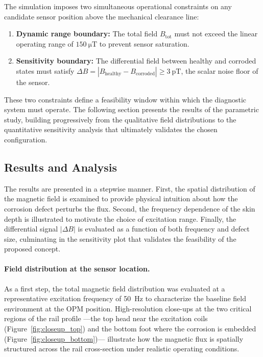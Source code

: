 The simulation imposes two simultaneous operational constraints on any
candidate sensor position above the mechanical clearance line:

\begin{enumerate}
    \item \textbf{Dynamic range boundary:} The total field $B_{\mathrm{tot}}$
    must not exceed the linear operating range of
    $\SI{150}{\micro\tesla}$ to prevent sensor saturation.

    \item \textbf{Sensitivity boundary:} The differential field between
    healthy and corroded states must satisfy $\Delta B =
    |B_{\mathrm{healthy}} - B_{\mathrm{corroded}}| \geq \SI{3}{\pico\tesla}$,
    the scalar noise floor of the sensor.
\end{enumerate}

These two constraints define a feasibility window within which the
diagnostic system must operate. The following section presents the results
of the parametric study, building progressively from the qualitative field
distributions to the quantitative sensitivity analysis that ultimately
validates the chosen configuration.

\subsection{Results and Analysis}
\label{sec:results_analysis}
The results are presented in a stepwise manner. First, the spatial
distribution of the magnetic field is examined to provide physical intuition
about how the corrosion defect perturbs the flux. Second, the frequency
dependence of the skin depth is illustrated to motivate the choice of
excitation range. Finally, the differential signal $|\Delta B|$ is
evaluated as a function of both frequency and defect size, culminating in
the sensitivity plot that validates the feasibility of the proposed concept.


\paragraph{Field distribution at the sensor location.}
As a first step, the total magnetic field distribution was evaluated at a
representative excitation frequency of \SI{50}{\hertz} to characterize
the baseline field environment at the OPM position. High-resolution close-ups
at the two critical regions of the rail profile ---the top head near the
excitation coils (Figure~\ref{fig:closeup_top}) and the bottom foot where
the corrosion is embedded (Figure~\ref{fig:closeup_bottom})--- illustrate
how the magnetic flux is spatially structured across the rail
cross-section under realistic operating conditions.

